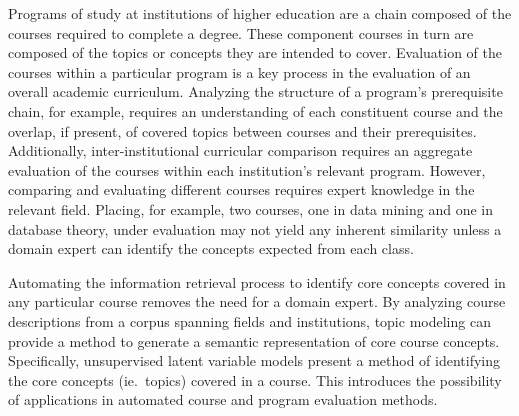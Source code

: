 Programs of study at institutions of higher education are a chain composed
of the courses required to complete a degree. These component courses in
turn are composed of the topics or concepts they are intended to cover.
Evaluation of the courses within a particular program is a key process in
the evaluation of an overall academic curriculum. Analyzing the structure
of a program's prerequisite chain, for example, requires an understanding
of each constituent course and the overlap, if present, of covered topics
between courses and their prerequisites. Additionally, inter-institutional
curricular comparison requires an aggregate evaluation of the courses
within each institution's relevant program. However, comparing and
evaluating different courses requires expert knowledge in the relevant
field. Placing, for example, two courses, one in data mining and one in
database theory, under evaluation may not yield any inherent similarity
unless a domain expert can identify the concepts expected from each class.

Automating the information retrieval process to identify core concepts
covered in any particular course removes the need for a domain expert. By
analyzing course descriptions from a corpus spanning fields and institutions,
topic modeling can provide a method to generate a semantic representation
of core course concepts. Specifically, unsupervised latent variable models
present a method of identifying the core concepts (ie.\ topics) covered in
a course. This introduces the possibility of applications in automated
course and program evaluation methods.
